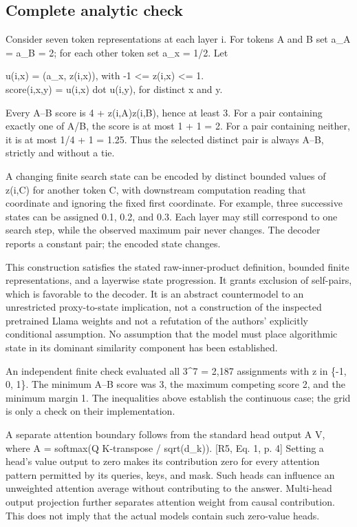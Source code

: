 \documentclass[10pt]{article}
\begin{document}
\subsection*{Complete analytic check}
Consider seven token representations at each layer i. For tokens A and B set a\_A = a\_B = 2; for each other token set a\_x = 1/2. Let\par
{\ttfamily\footnotesize u(i,x) = (a\_x, z(i,x)), with -1 <= z(i,x) <= 1.\\
score(i,x,y) = u(i,x) dot u(i,y), for distinct x and y.}\par
Every A–B score is 4 + z(i,A)z(i,B), hence at least 3. For a pair containing exactly one of A/B, the score is at most 1 + 1 = 2. For a pair containing neither, it is at most 1/4 + 1 = 1.25. Thus the selected distinct pair is always A–B, strictly and without a tie.\par
A changing finite search state can be encoded by distinct bounded values of z(i,C) for another token C, with downstream computation reading that coordinate and ignoring the fixed first coordinate. For example, three successive states can be assigned 0.1, 0.2, and 0.3. Each layer may still correspond to one search step, while the observed maximum pair never changes. The decoder reports a constant pair; the encoded state changes.\par
This construction satisfies the stated raw-inner-product definition, bounded finite representations, and a layerwise state progression. It grants exclusion of self-pairs, which is favorable to the decoder. It is an abstract countermodel to an unrestricted proxy-to-state implication, not a construction of the inspected pretrained Llama weights and not a refutation of the authors’ explicitly conditional assumption. No assumption that the model must place algorithmic state in its dominant similarity component has been established.\par
An independent finite check evaluated all 3\textasciicircum{}7 = 2,187 assignments with z in \{-1, 0, 1\}. The minimum A–B score was 3, the maximum competing score 2, and the minimum margin 1. The inequalities above establish the continuous case; the grid is only a check on their implementation.\par
A separate attention boundary follows from the standard head output A V, where A = softmax(Q K-transpose / sqrt(d\_k)). [R5, Eq. 1, p. 4] Setting a head’s value output to zero makes its contribution zero for every attention pattern permitted by its queries, keys, and mask. Such heads can influence an unweighted attention average without contributing to the answer. Multi-head output projection further separates attention weight from causal contribution. This does not imply that the actual models contain such zero-value heads.\par
\end{document}

